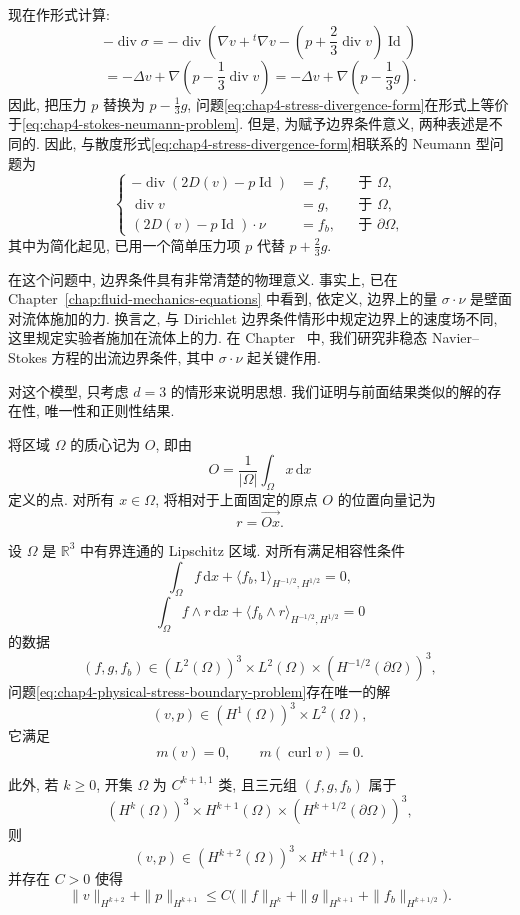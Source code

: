 现在作形式计算:
\[
 -\operatorname{div}\sigma
 =-\operatorname{div}\left(\nabla v+{}^t\nabla v
 -\left(p+\frac23\operatorname{div}v\right)\operatorname{Id}\right)
\]
\[
 =-\Delta v+\nabla\left(p-\frac13\operatorname{div}v\right)
 =-\Delta v+\nabla\left(p-\frac13g\right).
\]
因此, 把压力 $p$ 替换为 $p-\frac13g$, 问题\eqref{eq:chap4-stress-divergence-form}在形式上等价于\eqref{eq:chap4-stokes-neumann-problem}. 但是, 为赋予边界条件意义, 两种表述是不同的. 因此, 与散度形式\eqref{eq:chap4-stress-divergence-form}相联系的 Neumann 型问题为
\begin{equation}
 \left\{
 \begin{aligned}
  -\operatorname{div}(2D(v)-p\operatorname{Id})&=f,&&\text{于 }\Omega,\\
  \operatorname{div}v&=g,&&\text{于 }\Omega,\\
  (2D(v)-p\operatorname{Id})\cdot\nu&=f_b,&&\text{于 }\partial\Omega,
 \end{aligned}
 \right.
 \label{eq:chap4-physical-stress-boundary-problem}
\end{equation}
其中为简化起见, 已用一个简单压力项 $p$ 代替 $p+\frac23g$.

在这个问题中, 边界条件具有非常清楚的物理意义. 事实上, 已在 Chapter~\ref{chap:fluid-mechanics-equations} 中看到, 依定义, 边界上的量 $\sigma\cdot\nu$ 是壁面对流体施加的力. 换言之, 与 Dirichlet 边界条件情形中规定边界上的速度场不同, 这里规定实验者施加在流体上的力. 在 Chapter~ 中, 我们研究非稳态 Navier--Stokes 方程的出流边界条件, 其中 $\sigma\cdot\nu$ 起关键作用.

对这个模型, 只考虑 $d=3$ 的情形来说明思想. 我们证明与前面结果类似的解的存在性, 唯一性和正则性结果.

将区域 $\Omega$ 的质心记为 $O$, 即由
\[
 O=\frac1{|\Omega|}\int_\Omega x\,\mathrm dx
\]
定义的点. 对所有 $x\in\Omega$, 将相对于上面固定的原点 $O$ 的位置向量记为
\[
 r=\overrightarrow{Ox}.
\]

\begin{Theorem}
\label{thm:chap4-physical-stress-wellposedness-regularity}
设 $\Omega$ 是 $\mathbb R^3$ 中有界连通的 Lipschitz 区域. 对所有满足相容性条件
\[
 \int_\Omega f\,\mathrm dx+\langle f_b,1\rangle_{H^{-1/2},H^{1/2}}=0,
\]
\[
 \int_\Omega f\wedge r\,\mathrm dx
 +\langle f_b\wedge r\rangle_{H^{-1/2},H^{1/2}}=0
\]
的数据
\[
 (f,g,f_b)\in(L^2(\Omega))^3\times L^2(\Omega)\times(H^{-1/2}(\partial\Omega))^3,
\]
问题\eqref{eq:chap4-physical-stress-boundary-problem}存在唯一的解
\[
 (v,p)\in(H^1(\Omega))^3\times L^2(\Omega),
\]
它满足
\[
 m(v)=0,
 \qquad
 m(\operatorname{curl}v)=0.
\]

此外, 若 $k\geq0$, 开集 $\Omega$ 为 $C^{k+1,1}$ 类, 且三元组 $(f,g,f_b)$ 属于
\[
 (H^k(\Omega))^3\times H^{k+1}(\Omega)\times(H^{k+1/2}(\partial\Omega))^3,
\]
则
\[
 (v,p)\in(H^{k+2}(\Omega))^3\times H^{k+1}(\Omega),
\]
并存在 $C>0$ 使得
\[
 \|v\|_{H^{k+2}}+\|p\|_{H^{k+1}}
 \leq C\bigl(\|f\|_{H^k}+\|g\|_{H^{k+1}}+\|f_b\|_{H^{k+1/2}}\bigr).
\]
\end{Theorem}

